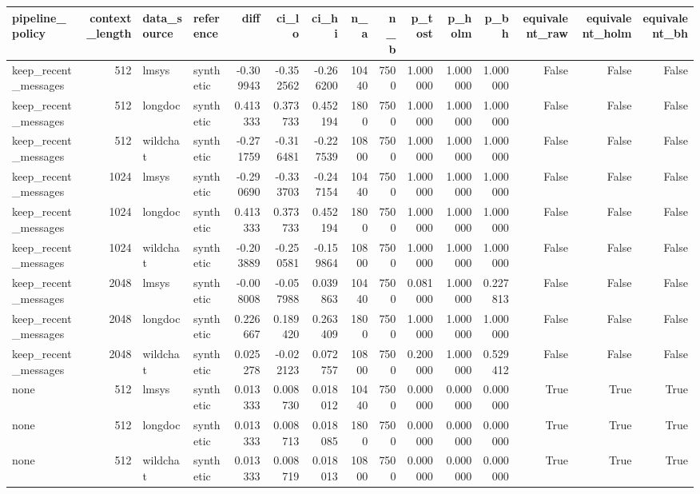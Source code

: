 \begin{tabular}{lrllrrrrrrrrrrr}
\toprule
pipeline_policy & context_length & data_source & reference & diff & ci_lo & ci_hi & n_a & n_b & p_tost & p_holm & p_bh & equivalent_raw & equivalent_holm & equivalent_bh \\
\midrule
keep_recent_messages & 512 & lmsys & synthetic & -0.309943 & -0.352562 & -0.266200 & 10440 & 7500 & 1.000000 & 1.000000 & 1.000000 & False & False & False \\
keep_recent_messages & 512 & longdoc & synthetic & 0.413333 & 0.373733 & 0.452194 & 1800 & 7500 & 1.000000 & 1.000000 & 1.000000 & False & False & False \\
keep_recent_messages & 512 & wildchat & synthetic & -0.271759 & -0.316481 & -0.227539 & 10800 & 7500 & 1.000000 & 1.000000 & 1.000000 & False & False & False \\
keep_recent_messages & 1024 & lmsys & synthetic & -0.290690 & -0.333703 & -0.247154 & 10440 & 7500 & 1.000000 & 1.000000 & 1.000000 & False & False & False \\
keep_recent_messages & 1024 & longdoc & synthetic & 0.413333 & 0.373733 & 0.452194 & 1800 & 7500 & 1.000000 & 1.000000 & 1.000000 & False & False & False \\
keep_recent_messages & 1024 & wildchat & synthetic & -0.203889 & -0.250581 & -0.159864 & 10800 & 7500 & 1.000000 & 1.000000 & 1.000000 & False & False & False \\
keep_recent_messages & 2048 & lmsys & synthetic & -0.008008 & -0.057988 & 0.039863 & 10440 & 7500 & 0.081000 & 1.000000 & 0.227813 & False & False & False \\
keep_recent_messages & 2048 & longdoc & synthetic & 0.226667 & 0.189420 & 0.263409 & 1800 & 7500 & 1.000000 & 1.000000 & 1.000000 & False & False & False \\
keep_recent_messages & 2048 & wildchat & synthetic & 0.025278 & -0.022123 & 0.072757 & 10800 & 7500 & 0.200000 & 1.000000 & 0.529412 & False & False & False \\
none & 512 & lmsys & synthetic & 0.013333 & 0.008730 & 0.018012 & 10440 & 7500 & 0.000000 & 0.000000 & 0.000000 & True & True & True \\
none & 512 & longdoc & synthetic & 0.013333 & 0.008713 & 0.018085 & 1800 & 7500 & 0.000000 & 0.000000 & 0.000000 & True & True & True \\
none & 512 & wildchat & synthetic & 0.013333 & 0.008719 & 0.018013 & 10800 & 7500 & 0.000000 & 0.000000 & 0.000000 & True & True & True \\

\end{tabular}
